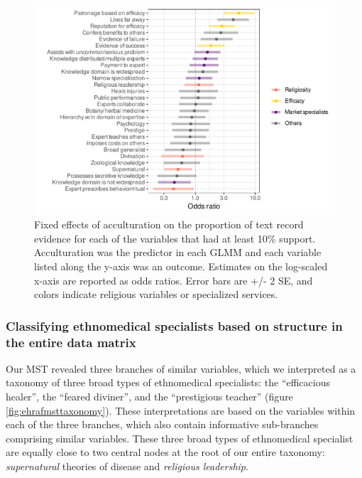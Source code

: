 \documentclass[
  11pt,
]{article}
\begin{document}
\begin{figure}
\centering
\includegraphics{magic-healers-article2_files/figure-latex/ehrafAcculturation-1.pdf}
\caption{\label{fig:ehrafAcculturation}Fixed effects of acculturation on the proportion of text record evidence for each of the variables that had at least 10\% support. Acculturation was the predictor in each GLMM and each variable listed along the y-axis was an outcome. Estimates on the log-scaled x-axis are reported as odds ratios. Error bars are +/- 2 SE, and colors indicate religious variables or specialized services.}
\end{figure}

\hypertarget{classifying-ethnomedical-specialists-based-on-structure-in-the-entire-data-matrix}{%
\subsubsection{Classifying ethnomedical specialists based on structure in the entire data matrix}\label{classifying-ethnomedical-specialists-based-on-structure-in-the-entire-data-matrix}}

Our MST revealed three branches of similar variables, which we interpreted as a taxonomy of three broad types of ethnomedical specialists: the ``efficacious healer'', the ``feared diviner'', and the ``prestigious teacher'' (figure \ref{fig:ehrafmsttaxonomy}). These interpretations are based on the variables within each of the three branches, which also contain informative sub-branches comprising similar variables. These three broad types of ethnomedical specialist are equally close to two central nodes at the root of our entire taxonomy: \emph{supernatural} theories of disease and \emph{religious leadership}.
\end{document}
